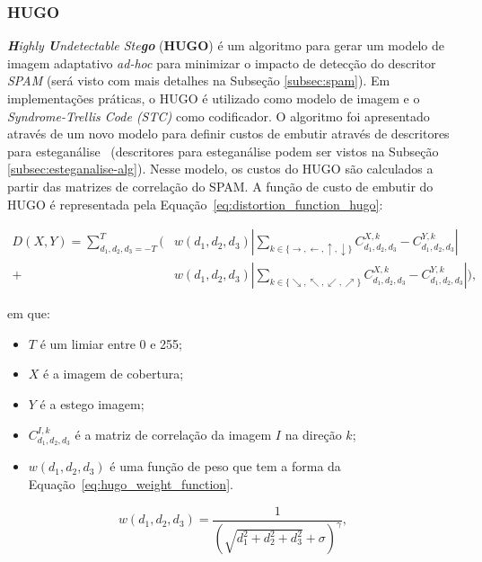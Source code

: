 

\subsubsection{HUGO}
\label{subsec:hugo}

\textit{\textbf{H}ighly \textbf{U}ndetectable Ste\textbf{go}} (\textbf{HUGO}) é um algoritmo para gerar um modelo de imagem adaptativo \textit{ad-hoc} para minimizar o impacto de detecção do descritor \textit{SPAM} (será visto com mais detalhes na Subseção \ref{subsec:spam}). Em implementações práticas, o HUGO é utilizado como modelo de imagem e o \textit{Syndrome-Trellis Code (STC)} \cite{trelliscode} como codificador. O algoritmo foi apresentado através de um novo modelo para definir custos de embutir através de descritores para esteganálise~\cite{hugo} (descritores para esteganálise podem ser vistos na Subseção \ref{subsec:esteganalise-alg}). Nesse modelo, os custos do HUGO são calculados a partir das matrizes de correlação do SPAM. A função de custo de embutir do HUGO é representada pela Equação~\ref{eq:distortion_function_hugo}:

\begin{equation}\label{eq:distortion_function_hugo}
	\begin{aligned}
		D(X, Y) = \displaystyle\sum_{d_1, d_2, d_3 = -T}^{T}
			\Bigg(
				&w(d_1, d_2, d_3) \left\lvert \displaystyle\sum_{k\in\{\rightarrow,\leftarrow,\uparrow,\downarrow\}}{} C_{d_1,d_2,d_3}^{X,k} - C_{d_1,d_2,d_3}^{Y,k} \right\rvert \\
			+	&w(d_1, d_2, d_3)\left\lvert \displaystyle\sum_{k\in\{\searrow, \nwarrow, \swarrow, \nearrow\}} C_{d_1, d_2, d_3}^{X, k} - C_{d_1,d_2,d_3}^{Y,k} \right\rvert
			\Bigg),
	\end{aligned}
\end{equation}

\noindent em que:
\begin{itemize}
	\item $T$ é um limiar entre 0 e 255;
	\item $X$ é a imagem de cobertura;
	\item $Y$ é a estego imagem;
	\item $C_{d_1,d_2,d_3}^{I,k}$ é a matriz de correlação da imagem $I$ na direção $k$;
	\item $w(d_1, d_2, d_3)$ é uma função de peso que tem a forma da Equação~\ref{eq:hugo_weight_function}.
\end{itemize}
\begin{equation}\label{eq:hugo_weight_function} w(d_1, d_2, d_3) = \frac{1}{\left(
					\sqrt{d_1^2 + d_2^2 + d_3^2} + \sigma
				\right)^\gamma},
\end{equation}

